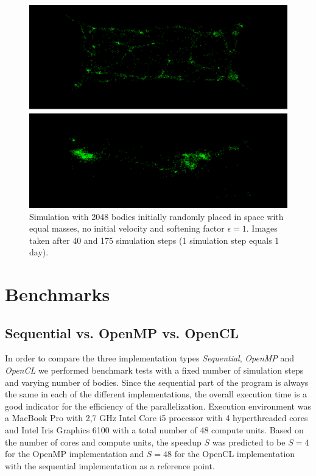 \documentclass[a4paper,11pt]{scrartcl} %
\begin{document}
\begin{figure}[tb]
  \centering
  \includegraphics[width=\textwidth]{img/simulation.png}
  \caption{Simulation with 2048 bodies initially randomly placed in space with equal masses, no initial velocity and softening factor $\epsilon = 1$. Images taken after 40 and 175 simulation steps (1 simulation step equals 1 day).}
  \label{fig:simulation_rendering}
\end{figure}

\section{Benchmarks}
\subsection{Sequential vs. OpenMP vs. OpenCL}
In order to compare the three implementation types \textit{Sequential}, \textit{OpenMP} and \textit{OpenCL} we performed benchmark tests with a fixed number of simulation steps and varying number of bodies. Since the sequential part of the program is always the same in each of the different implementations, the overall execution time is a good indicator for the efficiency of the parallelization. Execution environment was a MacBook Pro with 2,7 GHz Intel Core i5 processor with 4 hyperthreaded cores and Intel Iris Graphics 6100 with a total number of 48 compute units. Based on the number of cores and compute units, the speedup $S$ was predicted to be $S=4$ for the OpenMP implementation and $S=48$ for the OpenCL implementation with the sequential implementation as a reference point.\\
\end{document}
